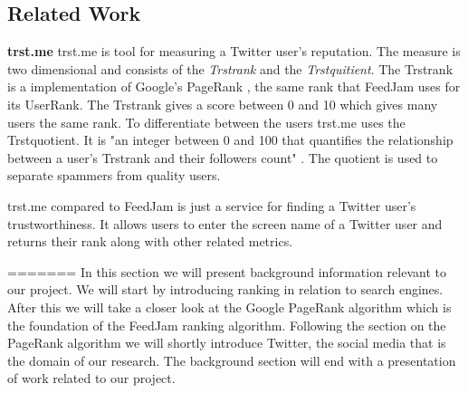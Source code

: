 \subsection{Related Work}
{\bf trst.me} \newline
trst.me \citet{Infochimps2012b} is tool for measuring a Twitter user's reputation. The measure is two dimensional and consists of the \emph{ Trstrank} and the \emph{Trstquitient}. The Trstrank is a implementation of Google's PageRank \citep{Infochimps2012a}, the same rank that FeedJam uses for its UserRank. The Trstrank gives a score between 0 and 10 which gives many users the same rank. To differentiate between the users trst.me uses the Trstquotient. It is "an integer between 0 and 100 that quantifies the relationship between a user's Trstrank and their followers count" \citep{Infochimps2012}. The quotient is used to separate spammers from quality users. 

trst.me compared to FeedJam is just a service for finding a Twitter user's trustworthiness. It allows users to enter the screen name of a Twitter user and returns their rank along with other related metrics.

=======
In this section we will present background information relevant to our project. We will start by introducing ranking in relation to search engines. After this we will take a closer look at the Google PageRank algorithm which is the foundation of the FeedJam ranking algorithm.  Following the section on the PageRank algorithm we will shortly introduce Twitter, the social media that is the domain of our research. The background section will end with a presentation of work related to our project.

